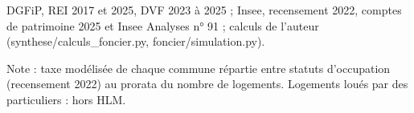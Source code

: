 DGFiP, REI 2017 et 2025, DVF 2023 à 2025 ; Insee, recensement 2022, comptes de patrimoine 2025 et Insee Analyses n° 91 ; calculs de l'auteur (synthese/calculs\_foncier.py, foncier/simulation.py).\par Note : taxe modélisée de chaque commune répartie entre statuts d'occupation (recensement 2022) au prorata du nombre de logements. Logements loués par des particuliers : hors HLM.
